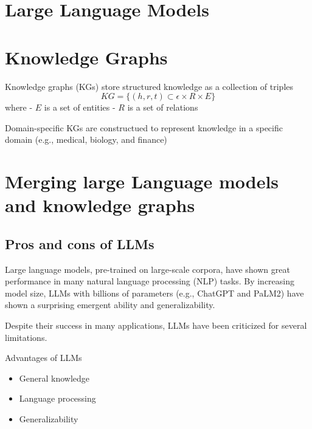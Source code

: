 \documentclass[11pt, reqno]{amsart}
\theoremstyle{definition}
\theoremstyle{remark}
\begin{document}
  \section{Large Language Models}

  \section{Knowledge Graphs}

  Knowledge graphs (KGs) store structured knowledge as a collection of triples
  \[
    KG = \{(h, r, t) \subset \epsilon \times R \times E\}
  \]
  where
  - $E$ is a set of entities
  - $R$ is a set of relations

  Domain-specific KGs are constructued to represent knowledge in a specific
  domain (e.g., medical, biology, and finance)


  \section{Merging large Language models and knowledge graphs}

  \subsection{Pros and cons of LLMs}

  Large language models, pre-trained on large-scale corpora, have shown great
  performance in many natural language processing (NLP) tasks. By increasing model
  size, LLMs with billions of parameters (e.g., ChatGPT and PaLM2) have shown a
  surprising emergent ability and generalizability.

  Despite their success in many applications, LLMs have been criticized for several
  limitations.

  Advantages of LLMs

  \begin{itemize}
    \item General knowledge

    \item Language processing

    \item Generalizability
  \end{itemize}
\end{document}
